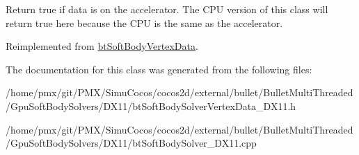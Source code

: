 Return true if data is on the accelerator. The C\+PU version of this class will return true here because the C\+PU is the same as the accelerator. 

Reimplemented from \hyperlink{classbtSoftBodyVertexData_a6512d196039f6445489a093ad18f7764}{bt\+Soft\+Body\+Vertex\+Data}.



The documentation for this class was generated from the following files\+:\begin{DoxyCompactItemize}
\item 
/home/pmx/git/\+P\+M\+X/\+Simu\+Cocos/cocos2d/external/bullet/\+Bullet\+Multi\+Threaded/\+Gpu\+Soft\+Body\+Solvers/\+D\+X11/bt\+Soft\+Body\+Solver\+Vertex\+Data\+\_\+\+D\+X11.\+h\item 
/home/pmx/git/\+P\+M\+X/\+Simu\+Cocos/cocos2d/external/bullet/\+Bullet\+Multi\+Threaded/\+Gpu\+Soft\+Body\+Solvers/\+D\+X11/bt\+Soft\+Body\+Solver\+\_\+\+D\+X11.\+cpp\end{DoxyCompactItemize}
